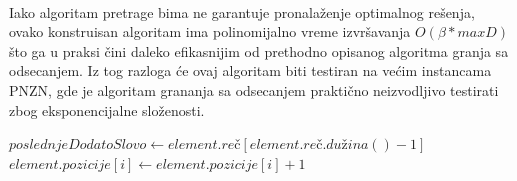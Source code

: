 \documentclass[12pt,oneside]{memoir}
\begin{document}
\begin{algorithm}
  \caption{$\textbf{RedukujBim}\bm{(\mathcal{B}\textbf{, }prona\textbf{đ}enaNadniska)}$}
  \label{alg:redukujbim}
  \end{algorithm}
\\
Iako algoritam pretrage bima ne garantuje pronalaženje optimalnog rešenja, ovako konstruisan algoritam
ima polinomijalno vreme izvršavanja $O(\beta*maxD)$ što ga u praksi čini daleko efikasnijim od
prethodno opisanog algoritma granja sa odsecanjem. Iz tog razloga će ovaj algoritam biti testiran na
većim instancama PNZN, gde je algoritam grananja sa odsecanjem praktično neizvodljivo testirati
zbog eksponencijalne složenosti.
\\
\begin{algorithm}
  \caption{$\textbf{AžurirajPozicije}\bm{(element)}$}
  \label{alg:azurirajPozicije}
  \begin{algorithmic}[1]
    \State $poslednjeDodatoSlovo \gets element.re\textrm{č}[element.re\textrm{č}.du\textrm{ž}ina() - 1]$
    \State
            \State $element.pozicije[i] \gets element.pozicije[i] + 1$
      \EndIf
    \EndFor
  \end{algorithmic}
  \end{algorithm}
\end{document}
